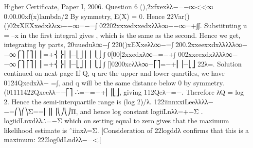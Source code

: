 Higher Certificate, Paper I, 2006. Question 6
(),2xfxexλλ−=−∞<<∞
0.00.00xf(x)lambda/2
By symmetry, E(X) = 0.
Hence 22Var()()02xXEXxedxλλ∞−−∞=−=∫ {}02202xxxedxxedxλλλ∞−−∞=+∫∫.
Substituting u = –x in the first integral gives , which is the same as the second. Hence we get, integrating by parts, 20uueduλ∞−∫
220()xEXxeλλ∞−=∫
200.2xxeexxdxλλλλλ∞−−∞⎧⎫⎡⎤⎪⎪=+⎨⎬⎢⎥−⎣⎦⎪⎪⎩⎭∫
0[00]2xxedxλ∞−=−+∫
002xxeexdxλλλλ∞−−∞⎧⎫⎡⎤⎪⎪=+⎨⎬⎢⎥−⎣⎦⎪⎪⎩⎭∫
[]0200xeλλλ∞−⎡⎤=−+⎢⎥−⎣⎦ 22λ=.
Solution continued on next page
If Q, q are the upper and lower quartiles, we have 0124Qxedxλλ− =∫, and q will be the same distance below 0 by symmetry.
(01111422Qxeeλλ−−⎡⎤ ∴=−=−+⎢⎥⎣⎦, giving 112Qeλ−=−. Therefore λQ = log 2. Hence the semi-interquartile range is (log 2)/λ.
122iinnxxiLeeλλλλ−−=⎛⎞⎛⎞Σ==⎜⎟⎜⎟⎝⎠⎝⎠Π, and hence log constant logiiLnλλ=+−Σ .
logiidLnxdλλ∴=−Σ which on setting equal to zero gives that the maximum likelihood estimate is ˆiinxλ=Σ. [Consideration of 22logddλ confirms that this is a maximum: 222log0dLndλλ−=<.]
